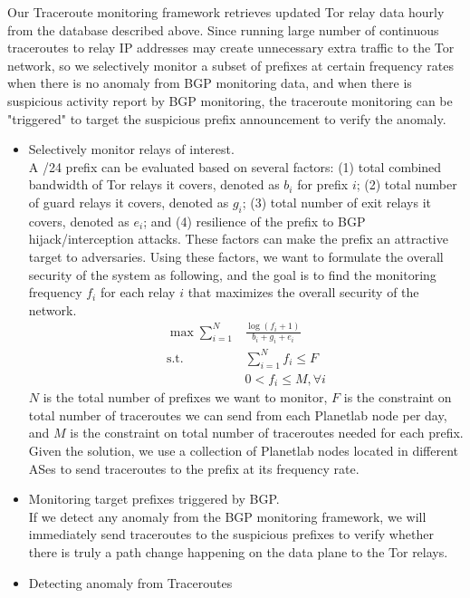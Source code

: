 Our Traceroute monitoring framework retrieves updated Tor relay data hourly from the database described above. Since running large number of continuous traceroutes to relay IP addresses may create unnecessary extra traffic to the Tor network, so we selectively monitor a subset of prefixes at certain frequency rates when there is no anomaly from BGP monitoring data, and when there is suspicious activity report by BGP monitoring, the traceroute monitoring can be "triggered" to target the suspicious prefix announcement to verify the anomaly. 
\begin{itemize}
\item Selectively monitor relays of interest.\\
A /24 prefix can be evaluated based on several factors: (1) total combined bandwidth of Tor relays it covers, denoted as $b_i$ for prefix $i$; (2) total number of guard relays it covers, denoted as $g_i$; (3) total number of exit relays it covers, denoted as $e_i$; and (4) resilience of the prefix to BGP hijack/interception attacks. These factors can make the prefix an attractive target to adversaries. Using these factors, we want to formulate the overall security of the system as following, and the goal is to find the monitoring frequency $f_i$ for each relay $i$ that maximizes the overall security of the network. \\
\begin{align}
\max \sum_{i=1}^N & \frac {\log {(f_i + 1)}} {b_i + g_i + e_i}\\
\text{s.t. } &\sum_{i=1}^N f_i \leq F\\
&0 < f_i \leq M, \forall i
\end{align}
$N$ is the total number of prefixes we want to monitor, $F$ is the constraint on total number of traceroutes we can send from each Planetlab node per day, and $M$ is the constraint on total number of traceroutes needed for each prefix. Given the solution, we use a collection of Planetlab nodes located in different ASes to send traceroutes to the prefix at its frequency rate. 
\item Monitoring target prefixes triggered by BGP.\\
If we detect any anomaly from the BGP monitoring framework, we will immediately send traceroutes to the suspicious prefixes to verify whether there is truly a path change happening on the data plane to the Tor relays. 
\item Detecting anomaly from Traceroutes\\

\end{itemize}
